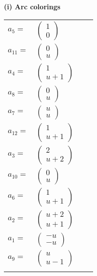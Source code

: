 \documentclass[1p]{elsarticle_modified}
\theoremstyle{definition}
\begin{document}
\flushleft \textbf{(i) Arc colorings}\\
\begin{tabular}{m{7pt} m{180pt} m{7pt} m{180pt} }
\flushright $a_{5}=$&$\begin{pmatrix}1\\0\end{pmatrix}$ \\
\flushright $a_{11}=$&$\begin{pmatrix}0\\u\end{pmatrix}$ \\
\flushright $a_{4}=$&$\begin{pmatrix}1\\u+1\end{pmatrix}$ \\
\flushright $a_{8}=$&$\begin{pmatrix}0\\u\end{pmatrix}$ \\
\flushright $a_{7}=$&$\begin{pmatrix}u\\u\end{pmatrix}$ \\
\flushright $a_{12}=$&$\begin{pmatrix}1\\u+1\end{pmatrix}$ \\
\flushright $a_{3}=$&$\begin{pmatrix}2\\u+2\end{pmatrix}$ \\
\flushright $a_{10}=$&$\begin{pmatrix}0\\u\end{pmatrix}$ \\
\flushright $a_{6}=$&$\begin{pmatrix}1\\u+1\end{pmatrix}$ \\
\flushright $a_{2}=$&$\begin{pmatrix}u+2\\u+1\end{pmatrix}$ \\
\flushright $a_{1}=$&$\begin{pmatrix}- u\\- u\end{pmatrix}$ \\
\flushright $a_{9}=$&$\begin{pmatrix}u\\u-1\end{pmatrix}$\\&\end{tabular}
\end{document}
